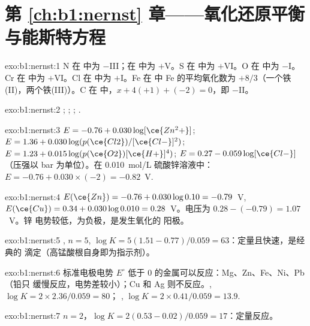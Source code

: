 \section*{第 \ref{ch:b1:nernst} 章——氧化还原平衡与能斯特方程}

\begin{solution}{exo:b1:nernst:1}
N 在  中为 $-$III；在  中为 $+$V。S 在  中为 $+$VI。O 在
 中为 $-$I。Cr 在  中为 $+$VI。Cl 在  中为 $+$I。Fe 在
 中 Fe 的平均氧化数为 $+8/3$（一个铁(II)，两个铁(III)）。C 在
 中，$x + 4(+1) + (-2) = 0$，即 $-$II。
\end{solution}

\begin{solution}{exo:b1:nernst:2}
;
;
;
.
\end{solution}

\begin{solution}{exo:b1:nernst:3}
$E = -0.76 + 0.030\log[\ce{Zn^2+}]$; $E = 1.36 + 0.030\log(p(\ce{Cl2})/[\ce{Cl-}]^2)$;
$E = 1.23 + 0.015\log(p(\ce{O2})[\ce{H+}]^4)$; $E = 0.27 - 0.059\log[\ce{Cl-}]$
（压强以 bar 为单位）。在 \qty{0.010}{mol/L} 硫酸锌溶液中：
$E = -0.76 + 0.030 \times (-2) = -0.82$~V.
\end{solution}

\begin{solution}{exo:b1:nernst:4}
$E(\ce{Zn}) = -0.76 + 0.030\log 0.10 = -0.79$~V, $E(\ce{Cu}) = 0.34 +
0.030\log 0.010 = 0.28$~V。电压为 $0.28 - (-0.79) = 1.07$~V。锌
电势较低，为负极，是发生氧化的
阳极。
\end{solution}

\begin{solution}{exo:b1:nernst:5}
, $n = 5$,
$\log K = 5(1.51 - 0.77)/0.059 = 63$：定量且快速，是经典的
滴定（高锰酸根自身即为指示剂）。
\end{solution}

\begin{solution}{exo:b1:nernst:6}
标准电极电势 $E^\circ$ 低于 0 的金属可以反应：Mg、Zn、Fe、Ni、Pb（铅只
缓慢反应，电势差较小）；Cu 和 Ag 则不反应。, $\log K = 2 \times 2.36/0.059 = 80$；
, $\log K = 2 \times 0.41/0.059 = 13.9$.
\end{solution}

\begin{solution}{exo:b1:nernst:7}
$n = 2$，$\log K = 2(0.53 - 0.02)/0.059 = 17$：定量反应。
\end{solution}


